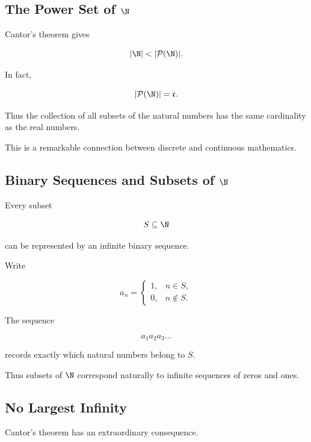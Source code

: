 \subsection{The Power Set of \(\N\)}
\label{subsec:power-set-n}

Cantor's theorem gives

\[ |\N|<|\mathcal P(\N)|. \]

In fact,

\[ |\mathcal P(\N)|=\mathfrak c. \]

Thus the collection of all subsets of the natural numbers has the same
cardinality as the real numbers.

This is a remarkable connection between discrete and continuous mathematics.

\subsection{Binary Sequences and Subsets of \(\N\)}
\label{subsec:binary-sequences-subsets}

Every subset

\[ S\subseteq\N \]

can be represented by an infinite binary sequence.

Write

\[ a_n=
\begin{cases}
1,&n\in S,\\
0,&n\notin S.
\end{cases} \]

The sequence

\[ a_1a_2a_3\ldots \]

records exactly which natural numbers belong to \(S\).

Thus subsets of \(\N\) correspond naturally to infinite sequences of zeros
and ones.

\subsection{No Largest Infinity}
\label{subsec:no-largest-infinity}

Cantor's theorem has an extraordinary consequence.

